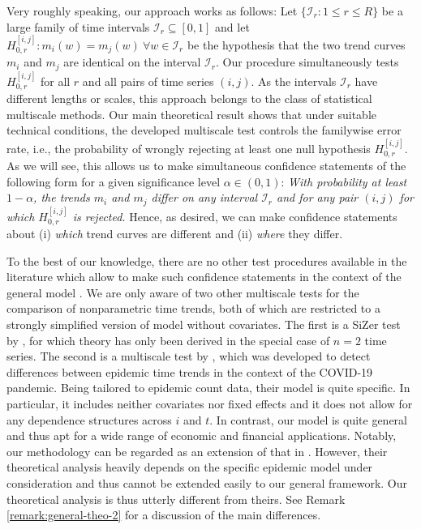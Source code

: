 \documentclass[12pt]{article}
\makeatletter
\renewcommand{\eqref}[1]{\tagform@{\ref{#1}}}
\makeatother
\begin{document}
Very roughly speaking, our approach works as follows: Let $\{\mathcal{I}_r: 1 \le r \le R\}$ be a large family of time intervals $\mathcal{I}_r \subseteq [0,1]$ and let $H_{0,r}^{[i,j]}: m_i(w) = m_j(w) \ \forall w \in \mathcal{I}_r$ be the hypothesis that the two trend curves $m_i$ and $m_j$ are identical on the interval $\mathcal{I}_r$. Our procedure simultaneously tests $H_{0,r}^{[i, j]}$ for all $r$ and all pairs of time series $(i,j)$. As the intervals $\mathcal{I}_r$ have different lengths or scales, this approach belongs to the class of statistical multiscale methods. Our main theoretical result shows that under suitable technical conditions, the developed multiscale test controls the familywise error rate, i.e., the probability of wrongly rejecting at least one null hypothesis $H_{0,r}^{[i, j]}$. As we will see, this allows us to make simultaneous confidence statements of the following form for a given significance level $\alpha \in (0,1)$: 
\textit{With probability at least $1-\alpha$, the trends $m_i$ and $m_j$ differ on any interval $\mathcal{I}_r$ and for any pair $(i,j)$ for which $H_{0,r}^{[i, j]}$ is rejected.} 
Hence, as desired, we can make confidence statements about (i) \textit{which} trend curves are different and (ii) \textit{where} they differ.


To the best of our knowledge, there are no other test procedures available in the literature which allow to make such confidence statements in the context of the general model \eqref{eq:model_full}. We are only aware of two other multiscale tests for the comparison of nonparametric time trends, both of which are restricted to a strongly simplified version of model \eqref{eq:model_full} without covariates. The first is a SiZer test by \cite{Park2009}, for which theory has only been derived in the special case of $n=2$ time series. The second is a multiscale test by \cite{KhismatullinaVogt2023}, which was developed to detect differences between epidemic time trends in the context of the COVID-19 pandemic. Being tailored to epidemic count data, their model is quite specific. In particular, it includes neither covariates nor fixed effects and it does not allow for any dependence structures across $i$ and $t$. In contrast, our model is quite general and thus apt for a wide range of economic and financial applications. Notably, our methodology can be regarded as an extension of that in \cite{KhismatullinaVogt2023}. However, their theoretical analysis heavily depends on the specific epidemic model under consideration and thus cannot be extended easily to our general framework. Our theoretical analysis is thus utterly different from theirs. See Remark \ref{remark:general-theo-2} for a discussion of the main differences. 
\end{document}
